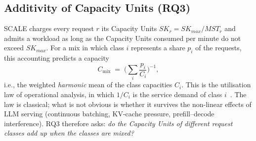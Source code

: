 %

\subsection{Additivity of Capacity Units (RQ3)}
\label{sec:additivity}

SCALE charges every request $r$ its Capacity Units $SK_r = SK_{max}/MST_r$ and admits a workload as long
as the Capacity Units consumed per minute do not exceed $SK_{max}$. For a mix in which class $i$
represents a share $p_i$ of the requests, this accounting predicts a capacity
\begin{equation}
  C_{\mathrm{mix}} \;=\; \Big(\sum_i \frac{p_i}{C_i}\Big)^{-1},
  \label{eq:harmonic}
\end{equation}
i.e., the weighted \emph{harmonic} mean of the class capacities $C_i$. This is the utilisation law of
operational analysis, in which $1/C_i$ is the service demand of class $i$~\cite{TODO-denning-buzen}.
The law is classical; what is not obvious is whether it survives the non-linear effects of LLM serving
(continuous batching, KV-cache pressure, prefill--decode interference). RQ3 therefore asks:
\emph{do the Capacity Units of different request classes add up when the classes are mixed?}

